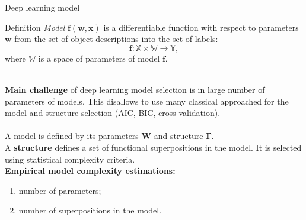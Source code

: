 \documentclass[usenames,dvipsnames,11pt,pdf,utf8,russian,aspectratio=169]{beamer}
\begin{document}
\begin{frame}{Deep learning model}
\small
\begin{block}{Definition}
\textit{Model} $\mathbf{f}(\mathbf{w}, \mathbf{x})$ is a differentiable function with respect to parameters $\mathbf{w}$  from the set of object descriptions into the set of labels:
\[
    \mathbf{f}: \mathbb{X} \times \mathbb{W} \to \mathbb{Y},
\] 
where $\mathbb{W}$ is a space of parameters of model $\mathbf{f}$.
\end{block}
~\\
\textbf{Main challenge} of deep learning model selection is in large number of parameters of models. This disallows to use many classical approached for the model and structure selection (AIC, BIC, cross-validation). \\~\\
A model is defined by its parameters $\mathbf{W}$ and structure $\boldsymbol{\Gamma}$.\\
A \textbf{structure} defines a set of functional superpositions in the model. It is selected using statistical complexity criteria.\\

\textbf{Empirical model complexity estimations:}
\begin{enumerate}
\item number of parameters;
\item number of superpositions in the model.
\end{enumerate}
\end{frame}
\end{document}
